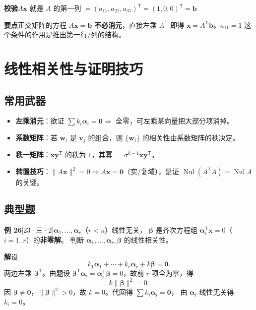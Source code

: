 \documentclass[10pt]{ctexart}
\newcommand{\Nul}{\operatorname{Nul}}
\newcommand{\TT}{^{\mathsf T}}
\newcommand{\yiii}[1]{\textcolor{y23}{[23·#1]}}
\begin{document}
\textbf{校验}\quad $A\mathbf x$ 就是 $A$ 的第一列 $=(a_{11},a_{21},a_{31})\TT=(1,0,0)\TT=\mathbf b$ \checkmark

\begin{tipbox}
\textbf{要点}\quad 正交矩阵的方程 $A\mathbf x=\mathbf b$ \textbf{不必消元}，直接左乘 $A\TT$ 即得
$\mathbf x=A\TT\mathbf b$。$a_{11}=1$ 这个条件的作用是推出第一行/列的结构。
\end{tipbox}

\section{线性相关性与证明技巧}

\subsection{常用武器}

\begin{itemize}
\item \textbf{左乘消元}：欲证 $\sum k_i\boldsymbol\alpha_i=\mathbf 0\Rightarrow$ 全零，可左乘某向量把大部分项消掉。
\item \textbf{系数矩阵}：若 $\mathbf w_i$ 是 $\mathbf v_j$ 的组合，则 $\{\mathbf w_i\}$ 的相关性由系数矩阵的秩决定。
\item \textbf{秩一矩阵}：$\mathbf x\mathbf y\TT$ 的秩为 $1$，其幂 $=\sigma^{k-1}\mathbf x\mathbf y\TT$。
\item \textbf{转置技巧}：$\lVert A\mathbf x\rVert^2=0\Rightarrow A\mathbf x=\mathbf 0$（实/复域），是证 $\Nul(A\TT A)=\Nul A$ 的关键。
\end{itemize}

\subsection{典型题}

\textbf{例 26}\yiii{三·2}\quad $\boldsymbol\alpha_1,\dots,\boldsymbol\alpha_r$（$r<n$）线性无关，
$\boldsymbol\beta$ 是齐次方程组 $\boldsymbol\alpha_i\TT\mathbf x=0$（$i=1..r$）的\textbf{非零解}。
判断 $\boldsymbol\alpha_1,\dots,\boldsymbol\alpha_r,\boldsymbol\beta$ 的线性相关性。

\textbf{解}\quad 设
\[
k_1\boldsymbol\alpha_1+\cdots+k_r\boldsymbol\alpha_r+k\boldsymbol\beta=\mathbf 0 .
\]
两边左乘 $\boldsymbol\beta\TT$。由题设 $\boldsymbol\beta\TT\boldsymbol\alpha_i=\boldsymbol\alpha_i\TT\boldsymbol\beta=0$，故前 $r$ 项全为零，得
\[
k\lVert\boldsymbol\beta\rVert^2=0 .
\]
因 $\boldsymbol\beta\ne\mathbf 0$，$\lVert\boldsymbol\beta\rVert^2>0$，故 $k=0$。代回得 $\sum k_i\boldsymbol\alpha_i=\mathbf 0$，
由 $\boldsymbol\alpha_i$ 线性无关得 $k_i=0$。
\end{document}
